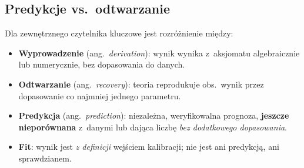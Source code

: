 \subsection{Predykcje vs.~odtwarzanie}\label{ssec:predykcje-vs-odtwarzanie}

\begin{remark}\label{rem:predykcje-klasyfikacja}
Dla zewn\k{e}trznego czytelnika kluczowe jest rozr\'o\.znienie mi\k{e}dzy:
\begin{itemize}[nosep]
  \item \textbf{Wyprowadzenie} (ang.\ \emph{derivation}): wynik wynika z~aksjomatu
    algebraicznie lub numerycznie, bez dopasowania do danych.
  \item \textbf{Odtwarzanie} (ang.\ \emph{recovery}): teoria reprodukuje obs.\ wynik
    przez dopasowanie co najmniej jednego parametru.
  \item \textbf{Predykcja} (ang.\ \emph{prediction}): niezale\.zna, weryfikowalna
    prognoza, \textbf{jeszcze nieporównana} z~danymi lub daj\k{a}ca
    liczb\k{e} \emph{bez dodatkowego dopasowania}.
  \item \textbf{Fit}: wynik jest \emph{z definicji} wej\'sciem kalibracji;
    nie jest ani predykcj\k{a}, ani sprawdzianem.
\end{itemize}
\end{remark}

